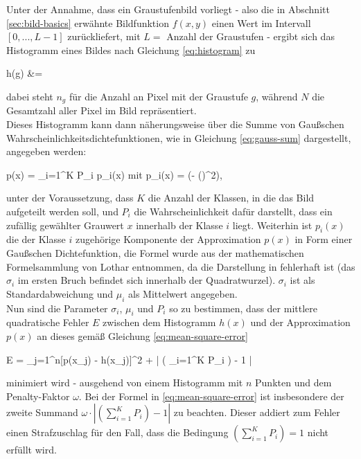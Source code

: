 		Unter der Annahme, dass ein Graustufenbild vorliegt - also die in Abschnitt \ref{sec:bild-basics} erwähnte Bildfunktion $f(x,y)$ einen Wert im Intervall $[0, ..., L-1]$ zurückliefert, mit $L = $ Anzahl der Graustufen - ergibt sich das Histogramm eines Bildes nach Gleichung \ref{eq:histogram} zu
		\begin{flalign}
			\centering
			h(g) &=  \label{eq:histogram}
		\end{flalign}
		dabei steht $n_{g}$ für die Anzahl an Pixel mit der Graustufe $g$, während $N$ die Gesamtzahl aller Pixel im Bild repräsentiert.\\
		Dieses Histogramm kann dann näherungsweise über die Summe von Gaußschen Wahrscheinlichkeitsdichtefunktionen, wie in Gleichung \ref{eq:gauss-sum} dargestellt, angegeben werden:
		\begin{flalign}
			\centering
			p(x) = \sum_{i=1}^{K} P_{i} \cdot p_{i}(x) \quad \textrm{mit} \quad p_{i}(x) =  \exp\left(- \cdot \left(\right)^{2}\right), \label{eq:gauss-sum}
		\end{flalign}
		unter der Voraussetzung, dass $K$ die Anzahl der Klassen, in die das Bild aufgeteilt werden soll, und $P_{i}$ die Wahrscheinlichkeit dafür darstellt, dass ein zufällig gewählter Grauwert $x$ innerhalb der Klasse $i$ liegt. Weiterhin ist $p_{i}(x)$ die der Klasse $i$ zugehörige Komponente der Approximation $p(x)$ in Form einer Gaußschen Dichtefunktion, die Formel wurde aus der mathematischen Formelsammlung von Lothar \cite{papula-gauss} entnommen, da die Darstellung in \cite{cuevas-meth1} fehlerhaft ist (das $\sigma_{i}$ im ersten Bruch befindet sich innerhalb der Quadratwurzel). $\sigma_{i}$ ist als Standardabweichung und $\mu_{i}$ als Mittelwert angegeben.\\
		Nun sind die Parameter $\sigma_{i}$, $\mu_{i}$ und $P_{i}$ so zu bestimmen, dass der mittlere quadratische Fehler $E$ zwischen dem Histogramm $h(x)$ und der Approximation $p(x)$ an dieses gemäß Gleichung \ref{eq:mean-square-error}
		\begin{flalign}
			\centering
			E =  \sum_{j=1}^{n}[p(x_{j}) - h(x_{j})]^{2} + \omega \cdot \left| \left( \sum_{i=1}^{K} P_{i} \right) - 1 \right| \label{eq:mean-square-error}
		\end{flalign}
		minimiert wird - ausgehend von einem Histogramm mit $n$ Punkten und dem Penalty-Faktor $\omega$. Bei der Formel in \ref{eq:mean-square-error} ist insbesondere der zweite Summand $\omega \cdot \left| \left( \sum_{i=1}^{K} P_{i} \right) - 1 \right|$ zu beachten. Dieser addiert zum Fehler einen Strafzuschlag für den Fall, dass die Bedingung $\left( \sum_{i=1}^{K} P_{i} \right) = 1$ nicht erfüllt wird. \\
